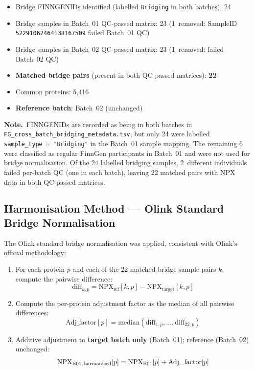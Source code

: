 \documentclass[11pt,a4paper]{article}
\begin{document}
\begin{itemize}
  \item Bridge FINNGENIDs identified (labelled \texttt{Bridging} in both batches): 24
  \item Bridge samples in Batch~01 QC-passed matrix: 23
        (1~removed: SampleID \texttt{52291062464138167509} failed Batch~01 QC)
  \item Bridge samples in Batch~02 QC-passed matrix: 23
        (1~removed: failed Batch~02 QC)
  \item \textbf{Matched bridge pairs} (present in both QC-passed matrices): \textbf{22}
  \item Common proteins: 5,416
  \item \textbf{Reference batch}: Batch~02 (unchanged)
\end{itemize}

\textbf{Note.}~FINNGENIDs are recorded as being in both batches
in \texttt{FG\_cross\_batch\_bridging\_metadata.tsv}, but only 24 were
labelled \texttt{sample\_type\,=\,"Bridging"} in the Batch~01 sample
mapping. The remaining 6 were classified as regular FinnGen participants in
Batch~01 and were not used for bridge normalisation. Of the 24 labelled
bridging samples, 2~different individuals failed per-batch QC (one in each
batch), leaving 22 matched pairs with NPX data in both QC-passed matrices.

\subsection{Harmonisation Method --- Olink Standard Bridge Normalisation}

The Olink standard bridge normalisation was applied, consistent with Olink's
official methodology:

\begin{enumerate}
  \item For each protein $p$ and each of the 22 matched bridge sample pairs
        $k$, compute the pairwise difference:
    \[
      \text{diff}_{k,p} =
        \text{NPX}_{\text{ref}}[k, p]
        - \text{NPX}_{\text{target}}[k, p]
    \]
  \item Compute the per-protein adjustment factor as the median of all
        pairwise differences:
    \[
      \text{Adj\_factor}[p] =
        \text{median}(\text{diff}_{1,p}, \ldots, \text{diff}_{22,p})
    \]
  \item Additive adjustment to \textbf{target batch only} (Batch~01);
        reference (Batch~02) unchanged:
    \[
      \text{NPX}_{\text{B01,\,harmonised}}[p]
        = \text{NPX}_{\text{B01}}[p] + \text{Adj\_factor}[p]
    \]
\end{enumerate}
\end{document}
